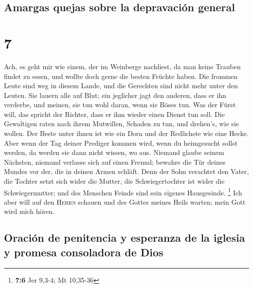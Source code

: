 \hypertarget{amargas-quejas-sobre-la-depravaciuxf3n-general}{%
\subsection{Amargas quejas sobre la depravación
general}\label{amargas-quejas-sobre-la-depravaciuxf3n-general}}

\hypertarget{section-6}{%
\section{7}\label{section-6}}

 Ach, es geht mir wie einem, der im Weinberge nachliest,
da man keine Trauben findet zu essen, und wollte doch gerne die besten
Früchte haben.  Die frommen Leute sind weg in diesem
Lande, und die Gerechten sind nicht mehr unter den Leuten. Sie lauern
alle auf Blut; ein jeglicher jagt den anderen, dass er ihn verderbe,
 und meinen, sie tun wohl daran, wenn sie Böses tun. Was
der Fürst will, das spricht der Richter, dass er ihm wieder einen Dienst
tun soll. Die Gewaltigen raten nach ihrem Mutwillen, Schaden zu tun, und
drehen's, wie sie wollen.  Der Beste unter ihnen ist wie
ein Dorn und der Redlichste wie eine Hecke. Aber wenn der Tag deiner
Prediger kommen wird, wenn du heimgesucht sollst werden, da werden sie
dann nicht wissen, wo aus.  Niemand glaube seinem
Nächsten, niemand verlasse sich auf einen Freund; bewahre die Tür deines
Mundes vor der, die in deinen Armen schläft.  Denn der
Sohn verachtet den Vater, die Tochter setzt sich wider die Mutter, die
Schwiegertochter ist wider die Schwiegermutter; und des Menschen Feinde
sind sein eigenes Hausgesinde. \footnote{\textbf{7:6} Jer 9,3-4; Mt
  10,35-36}  Ich aber will auf den \textsc{Herrn} schauen
und des Gottes meines Heils warten; mein Gott wird mich hören.

\hypertarget{oraciuxf3n-de-penitencia-y-esperanza-de-la-iglesia-y-promesa-consoladora-de-dios}{%
\subsection{Oración de penitencia y esperanza de la iglesia y promesa
consoladora de
Dios}\label{oraciuxf3n-de-penitencia-y-esperanza-de-la-iglesia-y-promesa-consoladora-de-dios}}

